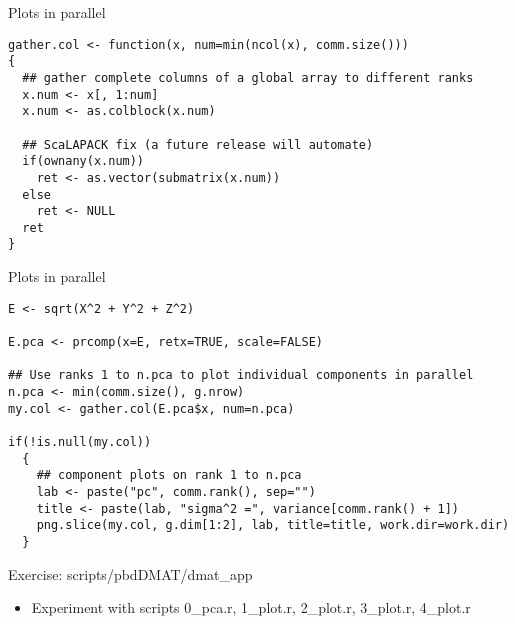 
\begin{frame}
  \begin{exampleblock}{Plots in parallel}\pause
\begin{lstlisting}[title=gather.col  (3\_plot.r)]
gather.col <- function(x, num=min(ncol(x), comm.size()))
{
  ## gather complete columns of a global array to different ranks
  x.num <- x[, 1:num]
  x.num <- as.colblock(x.num)

  ## ScaLAPACK fix (a future release will automate)
  if(ownany(x.num))
    ret <- as.vector(submatrix(x.num))
  else
    ret <- NULL
  ret
}
\end{lstlisting}
  \end{exampleblock}
\end{frame}

\begin{frame}
  \begin{exampleblock}{Plots in parallel}\pause
\begin{lstlisting}[title=Now Plot the PCA Components (4\_plot.r)]
E <- sqrt(X^2 + Y^2 + Z^2)

E.pca <- prcomp(x=E, retx=TRUE, scale=FALSE)

## Use ranks 1 to n.pca to plot individual components in parallel
n.pca <- min(comm.size(), g.nrow)
my.col <- gather.col(E.pca$x, num=n.pca)

if(!is.null(my.col))
  {
    ## component plots on rank 1 to n.pca
    lab <- paste("pc", comm.rank(), sep="")
    title <- paste(lab, "sigma^2 =", variance[comm.rank() + 1])
    png.slice(my.col, g.dim[1:2], lab, title=title, work.dir=work.dir)
  }
\end{lstlisting} %
  \end{exampleblock}
\end{frame}

\begin{frame}
  \begin{block}{Exercise: scripts/pbdDMAT/dmat\_app}\pause
  \begin{itemize}
  \item Experiment with scripts 0\_pca.r, 1\_plot.r, 2\_plot.r,
    3\_plot.r, 4\_plot.r
  \end{itemize}
  \end{block}
\end{frame}

